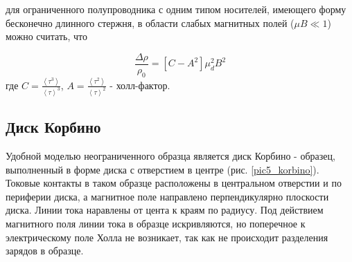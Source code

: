 для ограниченного полупроводника с одним типом носителей, имеющего форму бесконечно длинного стержня, в области слабых магнитных полей ($\mu B \ll 1$) можно считать, что

\begin{equation}
\frac{\Delta \rho}{\rho_{0}} = [C - A^2] \mu^{2}_{d} B^2
\end{equation}
где $C = \frac{\left< \tau^3 \right>}{\left< \tau \right>^3}$, $A = \frac{\left< \tau^2 \right>}{\left< \tau \right>^2}$ - холл-фактор.

\subsection{Диск Корбино}
Удобной моделью неограниченного образца является диск Корбино - образец, выполненный в форме диска с отверстием в центре (рис. \ref{pic5_korbino}). Токовые контакты в таком образце расположены в центральном отверстии и по периферии диска, а магнитное поле направлено перпендикулярно плоскости диска. Линии тока наравлены от цента к краям по радиусу. Под действием магнитного поля линии тока в образце искривляются, но поперечное к электрическому поле Холла не возникает, так как не происходит разделения зарядов в образце.